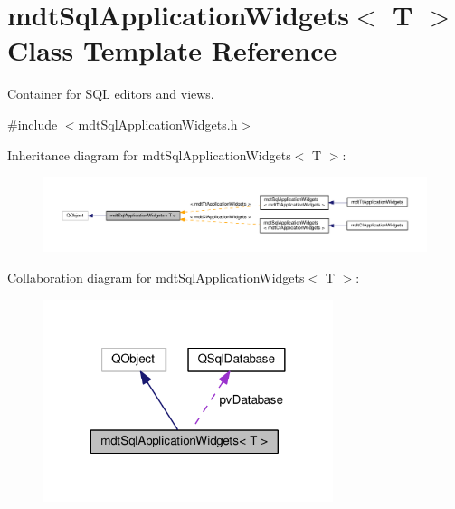 \hypertarget{classmdt_sql_application_widgets}{\section{mdt\-Sql\-Application\-Widgets$<$ T $>$ Class Template Reference}
\label{classmdt_sql_application_widgets}
}


Container for S\-Q\-L editors and views.  




{\ttfamily \#include $<$mdt\-Sql\-Application\-Widgets.\-h$>$}



Inheritance diagram for mdt\-Sql\-Application\-Widgets$<$ T $>$\-:
\nopagebreak
\begin{figure}[H]
\begin{center}
\leavevmode
\includegraphics[width=350pt]{classmdt_sql_application_widgets__inherit__graph}
\end{center}
\end{figure}


Collaboration diagram for mdt\-Sql\-Application\-Widgets$<$ T $>$\-:
\nopagebreak
\begin{figure}[H]
\begin{center}
\leavevmode
\includegraphics[width=240pt]{classmdt_sql_application_widgets__coll__graph}
\end{center}
\end{figure}
